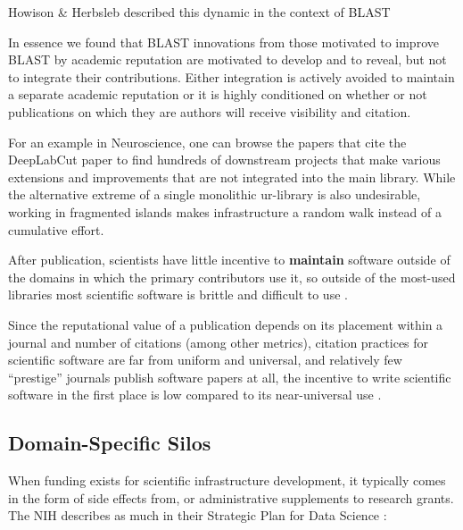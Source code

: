 Howison \& Herbsleb described this dynamic in the context of
BLAST

\begin{leftbar}
In essence we found that BLAST innovations from those motivated to
improve BLAST by academic reputation are motivated to develop and to
reveal, but not to integrate their contributions. Either integration is
actively avoided to maintain a separate academic reputation or it is
highly conditioned on whether or not publications on which they are
authors will receive visibility and citation. \citep{howisonIncentivesIntegrationScientific2013} 
\end{leftbar}

For an example in Neuroscience, one can browse the papers that cite the
DeepLabCut paper \citep{mathisDeepLabCutMarkerlessPose2018}  to
find hundreds of downstream projects that make various extensions and
improvements that are not integrated into the main library. While the
alternative extreme of a single monolithic ur-library is also
undesirable, working in fragmented islands makes infrastructure a random
walk instead of a cumulative effort.

After publication, scientists have little incentive to \textbf{maintain}
software outside of the domains in which the primary contributors use
it, so outside of the most-used libraries most scientific software is
brittle and difficult to use \citep{carverSurveyStatePractice2022, mangulImprovingUsabilityArchival2019, kumarBioinformaticsSoftwareBiologists2007} .

Since the reputational value of a publication depends on its placement
within a journal and number of citations (among other metrics), citation
practices for scientific software are far from uniform and universal,
and relatively few ``prestige'' journals publish software papers at all,
the incentive to write scientific software in the first place is low
compared to its near-universal use \citep{howisonSoftwareScientificLiterature2016} .

\hypertarget{domain-specific-silos}{%
\subsection{Domain-Specific Silos}\label{domain-specific-silos}}

When funding exists for scientific infrastructure development, it
typically comes in the form of side effects from, or administrative
supplements to research grants. The NIH describes as much in their
Strategic Plan for Data Science \citep{NIHStrategicPlan2018} :

